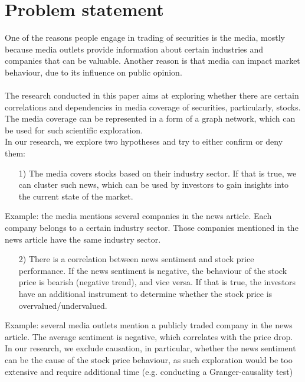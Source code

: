 \chapter{Problem statement}
\label{cha:problem-statement}

One of the reasons people engage in trading of securities is the media, mostly because media outlets provide information about certain industries and companies that can be valuable. Another reason is that media can impact market behaviour, due to its influence on public opinion.\\
\\
\noindent The research conducted in this paper aims at exploring whether there are certain correlations and dependencies in media coverage of securities, particularly, stocks. The media coverage can be represented in a form of a graph network, which can be used for such scientific exploration.
\\

\noindent In our research, we explore two hypotheses and try to either confirm or deny them:


\begin{itemize}
\item[1)] The media covers stocks based on their industry sector. If that is true, we can cluster such news, which can be used by investors to gain insights into the current state of the market.
\end{itemize}
Example: the media mentions several companies in the news article. Each company belongs to a certain industry sector. Those companies mentioned in the news article have the same industry sector.
\begin{itemize}
\item[2)] There is a correlation between news sentiment and stock price performance. If the news sentiment is negative, the behaviour of the stock price is bearish (negative trend), and vice versa. If that is true, the investors have an additional instrument to determine whether the stock price is overvalued/undervalued.
\end{itemize}
Example: several media outlets mention a publicly traded company in the news article. The average sentiment is negative, which correlates with the price drop.
In our research, we exclude causation, in particular, whether the news sentiment can be the cause of the stock price behaviour, as such exploration would be too extensive and require additional time (e.g. conducting a Granger-causality test)
